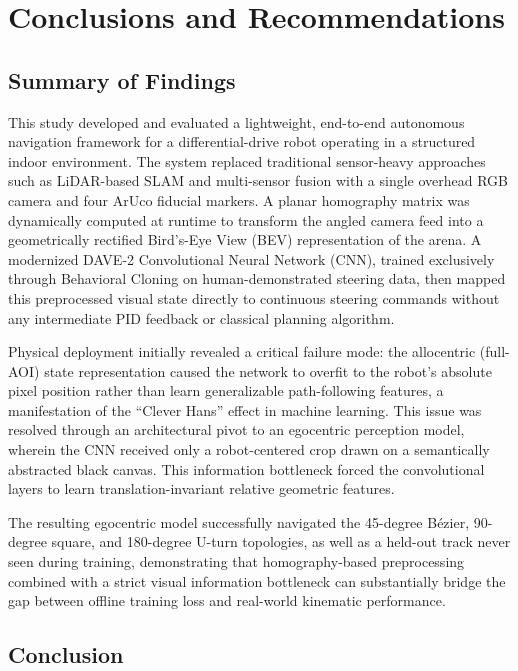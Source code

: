 \chapter{Conclusions and Recommendations}

\section{Summary of Findings}

This study developed and evaluated a lightweight, end-to-end autonomous navigation framework for a differential-drive robot operating in a structured indoor environment. The system replaced traditional sensor-heavy approaches such as LiDAR-based SLAM and multi-sensor fusion with a single overhead RGB camera and four ArUco fiducial markers. A planar homography matrix was dynamically computed at runtime to transform the angled camera feed into a geometrically rectified Bird's-Eye View (BEV) representation of the arena. A modernized DAVE-2 Convolutional Neural Network (CNN), trained exclusively through Behavioral Cloning on human-demonstrated steering data, then mapped this preprocessed visual state directly to continuous steering commands without any intermediate PID feedback or classical planning algorithm.

Physical deployment initially revealed a critical failure mode: the allocentric (full-AOI) state representation caused the network to overfit to the robot's absolute pixel position rather than learn generalizable path-following features, a manifestation of the ``Clever Hans'' effect in machine learning. This issue was resolved through an architectural pivot to an egocentric perception model, wherein the CNN received only a robot-centered crop drawn on a semantically abstracted black canvas. This information bottleneck forced the convolutional layers to learn translation-invariant relative geometric features.

The resulting egocentric model successfully navigated the 45-degree B\'ezier, 90-degree square, and 180-degree U-turn topologies, as well as a held-out track never seen during training, demonstrating that homography-based preprocessing combined with a strict visual information bottleneck can substantially bridge the gap between offline training loss and real-world kinematic performance.

\section{Conclusion}

